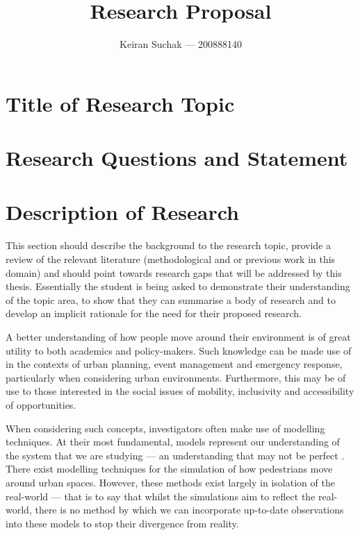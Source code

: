 \documentclass[12pt, twoside, a4paper]{article}
\begin{document}
\title{Research Proposal}
\author{Keiran Suchak --- 200888140}
\maketitle

\section{Title of Research Topic}\label{sec:title}

\section{Research Questions and Statement}\label{sec:questions}


\section{Description of Research}\label{sec:research_descr}

This section should describe the background to the research topic, provide a review of the relevant literature (methodological and or previous work in this domain) and should point towards research gaps that will be addressed by this thesis. 
Essentially the student is being asked to demonstrate their understanding of the topic area, to show that they can summarise a body of research and to develop an implicit rationale for the need for their proposed research.

A better understanding of how people move around their environment is of great
utility to both academics and policy-makers.
Such knowledge can be made use of in the contexts of urban planning, event
management and emergency response, particularly when considering urban
environments.
Furthermore, this may be of use to those interested in the social issues of
mobility, inclusivity and accessibility of opportunities.

When considering such concepts, investigators often make use of modelling
techniques.
At their most fundamental, models represent our understanding of the system that
we are studying --- an understanding that may not be perfect
\citep{stanislaw1986tests}.
There exist modelling techniques for the simulation of how pedestrians move
around urban spaces.
However, these methods exist largely in isolation of the real-world --- that is
to say that whilst the simulations aim to reflect the real-world, there is no
method by which we can incorporate up-to-date observations into these models to
stop their divergence from reality.
\end{document}
